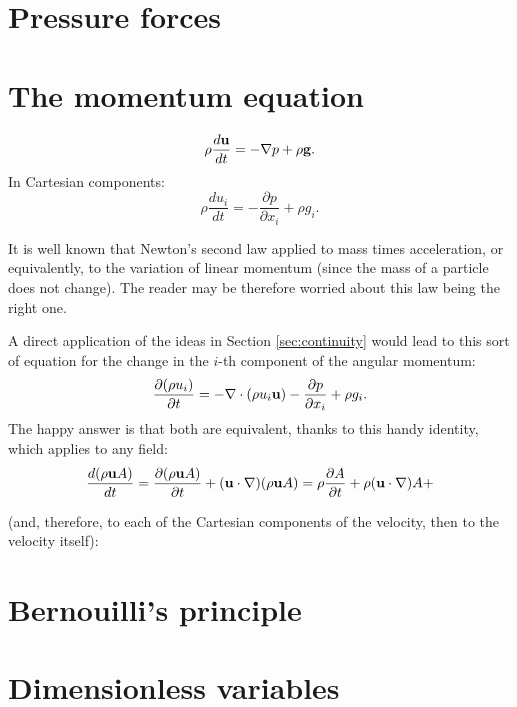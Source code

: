 \section{Pressure forces}


\section{The momentum equation}

\begin{equation}
  \label{eq:Euler_momentum}
  \rho \frac{d\mathbf{u} }{dt} =
  - \nabla p 
  + \rho \mathbf{g} .
\end{equation}
In Cartesian components:
\begin{equation}
  \label{eq:Euler_momentum_C}
  \rho \frac{d u_i }{dt} =
  - \frac{\partial p} {\partial x_i} 
  + \rho g_i .
\end{equation}

It is well known that Newton's second law applied to mass times
acceleration, or equivalently, to the variation of linear momentum
(since the mass of a particle does not change). The reader may be
therefore worried about this law being the right one.

A direct application of the ideas in Section \ref{sec:continuity}
would lead to this sort of equation for the change in the $i$-th
component of the angular momentum:
\[
\frac{\partial (\rho u_i) } {\partial t} =
- \nabla \cdot  ( \rho u_i \mathbf{u} )
- \frac{\partial p} {\partial x_i} 
  + \rho g_i .
\]
The happy answer is that both are equivalent, thanks to this handy
identity, which applies to any field:
\[
\frac{d( \rho \bfu A)  }{d t} =
\frac{\partial ( \rho \bfu  A ) }{\partial t} +
(\bfu \cdot \nabla) (\rho \bfu A) =
%
\rho \frac{\partial  A  }{\partial t} +
\rho (\bfu \cdot \nabla) A +

\]

 (and, therefore, to each of
the Cartesian components of the velocity, then to the velocity itself):


\section{Bernouilli's principle}




\section{Dimensionless variables}
\label{sec:Euler_adim}

